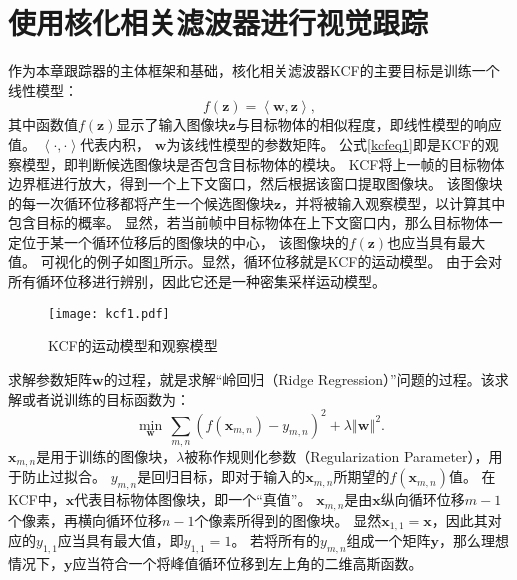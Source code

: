 \section{使用核化相关滤波器进行视觉跟踪}
\label{kcfsec}
作为本章跟踪器的主体框架和基础，核化相关滤波器KCF的主要目标是训练一个线性模型：
\begin{equation}
f(\mathbf{z})=\left\langle\mathbf{w}, \mathbf{z}\right\rangle ,
\label{kcfeq1}
\end{equation}
其中函数值$f(\mathbf{z})$显示了输入图像块$\mathbf{z}$与目标物体的相似程度，即线性模型的响应值。
$\left\langle\cdot, \cdot\right\rangle$代表内积，
$\mathbf{w}$为该线性模型的参数矩阵。
公式\ref{kcfeq1}即是KCF的观察模型，即判断候选图像块是否包含目标物体的模块。
KCF将上一帧的目标物体边界框进行放大，得到一个上下文窗口，然后根据该窗口提取图像块。
该图像块的每一次循环位移都将产生一个候选图像块$\mathbf{z}$，并将被输入观察模型，以计算其中包含目标的概率。
显然，若当前帧中目标物体在上下文窗口内，那么目标物体一定位于某一个循环位移后的图像块的中心，
该图像块的$f(\mathbf{z})$也应当具有最大值。
可视化的例子如图\ref{kcf1}所示。显然，循环位移就是KCF的运动模型。
由于会对所有循环位移进行辨别，因此它还是一种密集采样运动模型。

\begin{figure}[htb]
\centering
\texttt{[image: kcf1.pdf]}
\caption{KCF的运动模型和观察模型}
\label{kcf1}
\end{figure}

求解参数矩阵$\mathbf{w}$的过程，就是求解``岭回归（Ridge Regression）''问题的过程。该求解或者说训练的目标函数为：
\begin{equation}
	\underset{\mathbf{w}}{\min}\,\sum_{m,n}\left(f(\mathbf{x}_{m,n})-y_{m,n}\right)^{2}+\lambda\left\Vert \mathbf{w}\right\Vert ^{2}.
	\label{rrmin}
\end{equation}
$\mathbf{x}_{m,n}$是用于训练的图像块，$\lambda$被称作规则化参数（Regularization Parameter），用于防止过拟合。
$y_{m,n}$是回归目标，即对于输入的$\mathbf{x}_{m,n}$所期望的$f(\mathbf{x}_{m,n})$值。
在KCF中，$\mathbf{x}$代表目标物体图像块，即一个``真值''。
$\mathbf{x}_{m,n}$是由$\mathbf{x}$纵向循环位移$m-1$个像素，再横向循环位移$n-1$个像素所得到的图像块。
显然$\mathbf{x}_{1,1}=\mathbf{x}$，因此其对应的$y_{1,1}$应当具有最大值，即$y_{1,1}=1$。
若将所有的$y_{m,n}$组成一个矩阵$\mathbf{y}$，那么理想情况下，$\mathbf{y}$应当符合一个将峰值循环位移到左上角的二维高斯函数。

